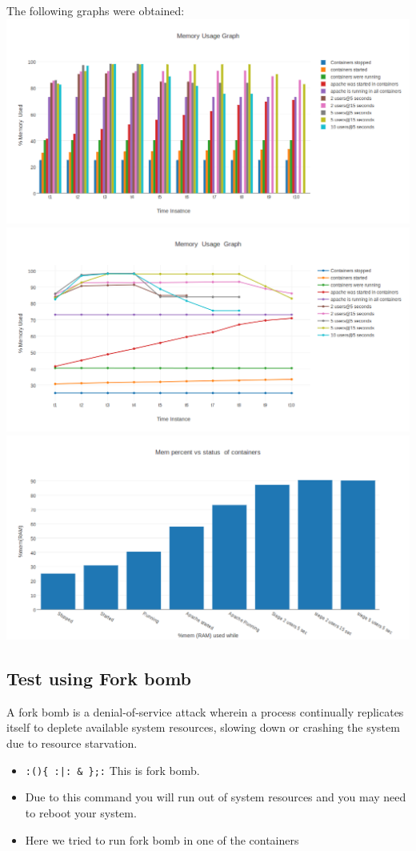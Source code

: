 \documentclass[11pt]{article}
\begin{document}
\begin{itemize}
The following graphs were obtained:
\includegraphics[width=.9\linewidth]{./images/memory-usage-time-bar-graph.png}
\includegraphics[width=.9\linewidth]{./images/memory-usage-time-line-graph.png}
\includegraphics[width=.9\linewidth]{./images/memory-usage-container-status-bar-graph.png}
\end{itemize}
\subsection{Test using Fork bomb}
\label{sec:orgheadline49}
A fork bomb is a denial-of-service attack wherein a process continually
replicates itself to deplete available system resources, slowing down or
crashing the system due to resource starvation.
\begin{itemize}
\item \texttt{:()\{ :|: \& \};:}  This is fork bomb.
\item Due to this command you will run out of system resources and you may need
to reboot your system.
\item Here we tried to run fork bomb in one of the containers
\end{itemize}
\end{document}
